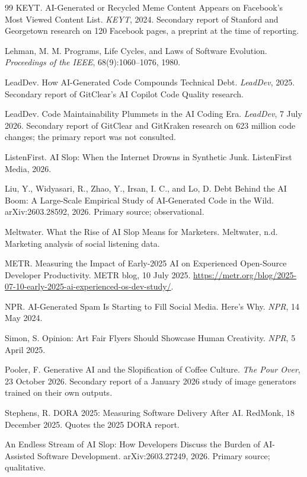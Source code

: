 \documentclass[11pt,a4paper]{article}
\theoremstyle{remark}
\begin{document}
\begin{thebibliography}{99}
KEYT. AI-Generated or Recycled Meme Content Appears on Facebook's Most Viewed Content List. \emph{KEYT}, 2024. Secondary report of Stanford and Georgetown research on 120 Facebook pages, a preprint at the time of reporting.

Lehman, M. M. Programs, Life Cycles, and Laws of Software Evolution. \emph{Proceedings of the IEEE}, 68(9):1060--1076, 1980.

LeadDev. How AI-Generated Code Compounds Technical Debt. \emph{LeadDev}, 2025. Secondary report of GitClear's AI Copilot Code Quality research.

LeadDev. Code Maintainability Plummets in the AI Coding Era. \emph{LeadDev}, 7 July 2026. Secondary report of GitClear and GitKraken research on 623 million code changes; the primary report was not consulted.

ListenFirst. AI Slop: When the Internet Drowns in Synthetic Junk. ListenFirst Media, 2026.

Liu, Y., Widyasari, R., Zhao, Y., Irsan, I. C., and Lo, D. Debt Behind the AI Boom: A Large-Scale Empirical Study of AI-Generated Code in the Wild. arXiv:2603.28592, 2026. Primary source; observational.

Meltwater. What the Rise of AI Slop Means for Marketers. Meltwater, n.d. Marketing analysis of social listening data.

METR. Measuring the Impact of Early-2025 AI on Experienced Open-Source Developer Productivity. METR blog, 10 July 2025. \url{https://metr.org/blog/2025-07-10-early-2025-ai-experienced-os-dev-study/}.

NPR. AI-Generated Spam Is Starting to Fill Social Media. Here's Why. \emph{NPR}, 14 May 2024.

Simon, S. Opinion: Art Fair Flyers Should Showcase Human Creativity. \emph{NPR}, 5 April 2025.

Pooler, F. Generative AI and the Slopification of Coffee Culture. \emph{The Pour Over}, 23 October 2026. Secondary report of a January 2026 study of image generators trained on their own outputs.

Stephens, R. DORA 2025: Measuring Software Delivery After AI. RedMonk, 18 December 2025. Quotes the 2025 DORA report.

An Endless Stream of AI Slop: How Developers Discuss the Burden of AI-Assisted Software Development. arXiv:2603.27249, 2026. Primary source; qualitative.


\end{thebibliography}
\end{document}
